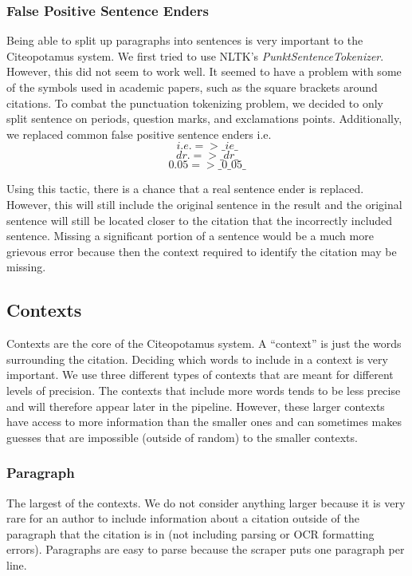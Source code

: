 \documentclass[10pt, conference, compsocconf]{IEEEtran}
\begin{document}
\subsubsection{False Positive Sentence Enders}\label{sec:fpEnders}
Being able to split up paragraphs into sentences is very important to the Citeopotamus system.
We first tried to use NLTK's \textit{PunktSentenceTokenizer}. However, this did not seem to work well.
It seemed to have a problem with some of the symbols used in academic papers, such as the square brackets around
citations. To combat the punctuation tokenizing problem, we decided to only split sentence on periods, question marks, and
exclamations points. Additionally, we replaced common false positive sentence enders i.e.
$$i.e. => \_ie\_$$
$$dr. => \_dr\_$$
$$0.05 => \_0\_05\_$$

Using this tactic, there is a chance that a real sentence ender is replaced. However, this will still
include the original sentence in the result and the original sentence will still be located closer to the
citation that the incorrectly included sentence. Missing a significant portion of a sentence would be a much more
grievous error because then the context required to identify the citation may be missing.

\subsection{Contexts}\label{sec:context}
Contexts are the core of the Citeopotamus system. A ``context'' is just the words surrounding the citation.
Deciding which words to include in a context is very important. We use three different types of contexts that are meant for different
levels of precision. The contexts that include more words tends to be less precise and will therefore appear later in the pipeline.
However, these larger contexts have access to more information than the smaller ones and can sometimes makes guesses that are impossible
(outside of random) to the smaller contexts.

\subsubsection{Paragraph}
The largest of the contexts. We do not consider anything larger because it is very rare for an author to include information about a citation
outside of the paragraph that the citation is in (not including parsing or OCR formatting errors). Paragraphs are easy to parse because the
scraper puts one paragraph per line.
\end{document}

